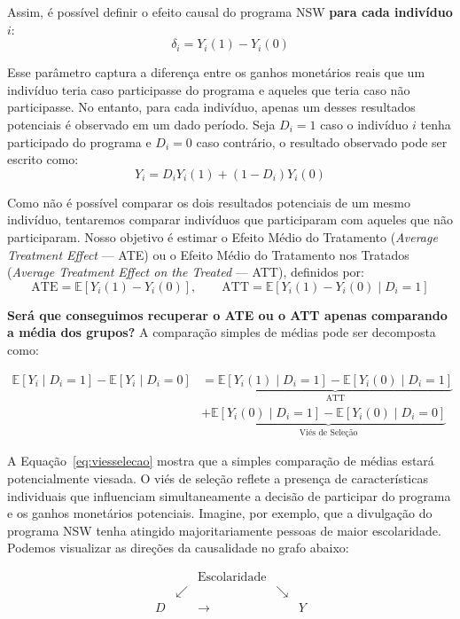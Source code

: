 \documentclass[12pt,a4paper]{article}
\begin{document}
Assim, é possível definir o efeito causal do programa NSW \textbf{para cada indivíduo $i$}:
$$\delta_i = Y_i(1) - Y_i(0)$$

Esse parâmetro captura a diferença entre os ganhos monetários reais que um indivíduo teria caso participasse do programa e aqueles que teria caso não participasse. No entanto, para cada indivíduo, apenas um desses resultados potenciais é observado em um dado período. Seja $D_i = 1$ caso o indivíduo $i$ tenha participado do programa e $D_i = 0$ caso contrário, o resultado observado pode ser escrito como:
$$Y_i = D_i Y_i(1) + (1 - D_i) Y_i(0)$$

Como não é possível comparar os dois resultados potenciais de um mesmo indivíduo, tentaremos comparar indivíduos que participaram com aqueles que não participaram. Nosso objetivo é estimar o Efeito Médio do Tratamento (\textit{Average Treatment Effect} --- ATE) ou o Efeito Médio do Tratamento nos Tratados (\textit{Average Treatment Effect on the Treated} --- ATT), definidos por:
$$\text{ATE} = \mathbb{E}[Y_i(1) - Y_i(0)], \qquad \text{ATT} = \mathbb{E}[Y_i(1) - Y_i(0) \mid D_i = 1]$$

\textbf{Será que conseguimos recuperar o ATE ou o ATT apenas comparando a média dos grupos?} A comparação simples de médias pode ser decomposta como:

\begin{equation}\label{eq:viesselecao}
    \begin{split}
        \mathbb{E}[Y_i \mid D_i = 1] - \mathbb{E}[Y_i \mid D_i = 0]
        &= \underbrace{\mathbb{E}[Y_i(1) \mid D_i = 1] - \mathbb{E}[Y_i(0) \mid D_i = 1]}_{\text{ATT}} \\
        &+ \underbrace{\mathbb{E}[Y_i(0) \mid D_i = 1] - \mathbb{E}[Y_i(0) \mid D_i = 0]}_{\text{Viés de Seleção}}
    \end{split}
\end{equation}

A Equação~\eqref{eq:viesselecao} mostra que a simples comparação de médias estará potencialmente viesada. O viés de seleção reflete a presença de características individuais que influenciam simultaneamente a decisão de participar do programa e os ganhos monetários potenciais. Imagine, por exemplo, que a divulgação do programa NSW tenha atingido majoritariamente pessoas de maior escolaridade. Podemos visualizar as direções da causalidade no grafo abaixo:

\[
\begin{array}{ccccc}
  & & \text{Escolaridade} & & \\
  & \swarrow & & \searrow \\
  D & &\longrightarrow && Y
\end{array}
\]
\end{document}
